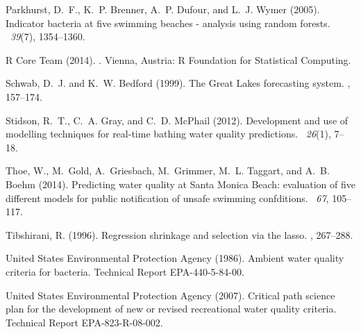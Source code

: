 \documentclass[authoryear,review, 12pt]{elsarticle}
\begin{document}
\begin{thebibliography}{}
Parkhurst, D.~F., K.~P. Brenner, A.~P. Dufour, and L.~J. Wymer (2005).
\newblock Indicator bacteria at five swimming beaches - analysis using random
  forests.
~{\em 39\/}(7), 1354--1360.

{R Core Team} (2014).
.
\newblock Vienna, Austria: R Foundation for Statistical Computing.

Schwab, D.~J. and K.~W. Bedford (1999).
\newblock The {Great Lakes} forecasting system.
, 157--174.

Stidson, R.~T., C.~A. Gray, and C.~D. McPhail (2012).
\newblock Development and use of modelling techniques for real-time bathing
  water quality predictions.
~{\em 26\/}(1), 7--18.

Thoe, W., M.~Gold, A.~Griesbach, M.~Grimmer, M.~L. Taggart, and A.~B. Boehm
  (2014).
\newblock Predicting water quality at {S}anta {M}onica {B}each: evaluation of
  five different models for public notification of unsafe swimming confditions.
~{\em 67}, 105--117.

Tibshirani, R. (1996).
\newblock Regression shrinkage and selection via the lasso.
, 267--288.

{United States Environmental Protection Agency} (1986).
\newblock Ambient water quality criteria for bacteria.
\newblock Technical Report EPA-440-5-84-00.

{United States Environmental Protection Agency} (2007).
\newblock Critical path science plan for the development of new or revised
  recreational water quality criteria.
\newblock Technical Report EPA-823-R-08-002.


\end{thebibliography}
\end{document}
